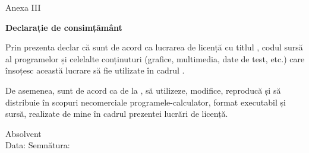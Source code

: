\begin{flushright}
    Anexa III
\end{flushright}

\vspace*{\fill}


\begin{center}
    \large
    \textbf{Declarație de consimțământ}
\end{center}

Prin prezenta declar că sunt de acord ca lucrarea de licență cu titlul \textbf{\thesistitle}, codul sursă al programelor și celelalte conținuturi (grafice, multimedia, date de test, etc.) care însoțesc această lucrare să fie utilizate în cadrul \facultyg.

De asemenea, sunt de acord ca \faculty \space de la \university, să utilizeze, modifice, reproducă și să distribuie în scopuri necomerciale programele-calculator, format executabil și sursă, realizate de mine în cadrul prezentei lucrări de licență.

\begin{flushright}
    Absolvent \textbf{\authornamelf} \\
    \vspace{0.5cm}
    Data: \dottedline \hspace{3cm} Semnătura: \dottedline
\end{flushright}
\vspace*{\fill}
\pagebreak